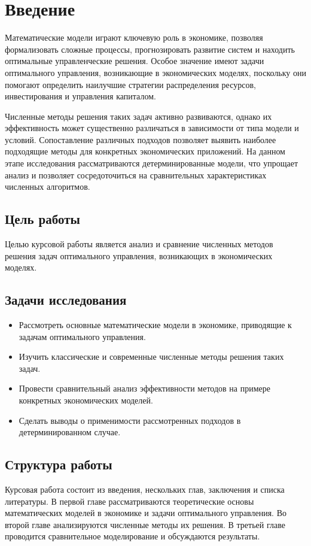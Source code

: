 \documentclass[a4paper,12pt]{article}
\begin{document}
\section{Введение}
{\fontsize{14pt}{20pt}\selectfont 
\hspace{1em}Математические модели играют ключевую роль в экономике, позволяя формализовать сложные процессы, прогнозировать развитие систем и находить оптимальные управленческие решения. Особое значение имеют задачи оптимального управления, возникающие в экономических моделях, поскольку они помогают определить наилучшие стратегии распределения ресурсов, инвестирования и управления капиталом.

Численные методы решения таких задач активно развиваются, однако их эффективность может существенно различаться в зависимости от типа модели и условий. Сопоставление различных подходов позволяет выявить наиболее подходящие методы для конкретных экономических приложений. На данном этапе исследования рассматриваются детерминированные модели, что упрощает анализ и позволяет сосредоточиться на сравнительных характеристиках численных алгоритмов.

\subsection{Цель работы}
\hspace{1em}Целью курсовой работы является анализ и сравнение численных методов решения задач оптимального управления, возникающих в экономических моделях.

\subsection{Задачи исследования}
\begin{itemize}
    \item Рассмотреть основные математические модели в экономике, приводящие к задачам оптимального управления.

    \item Изучить классические и современные численные методы решения таких задач.

    \item Провести сравнительный анализ эффективности методов на примере конкретных экономических моделей.

    \item Сделать выводы о применимости рассмотренных подходов в детерминированном случае.
\end{itemize}
\subsection{Структура работы}
Курсовая работа состоит из введения, нескольких глав, заключения и списка литературы. В первой главе рассматриваются теоретические основы математических моделей в экономике и задачи оптимального управления. Во второй главе анализируются численные методы их решения. В третьей главе проводится сравнительное моделирование и обсуждаются результаты.

}
\end{document}
